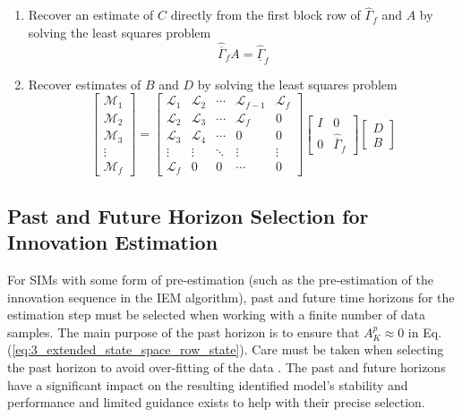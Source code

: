 \begin{table}[!htb]
{\begin{minipage}{5.5in}
\begin{enumerate}
\item Recover an estimate of $C$ directly from the first block row of $\hat{\Gamma}_f$ and $A$ by solving the least squares problem
\begin{equation*}
\hat{\overline{\Gamma}}_f A = \hat{\underline{\Gamma}}_f
\end{equation*}

\item Recover estimates of $B$ and $D$ by solving the least squares problem
\begin{equation*}
\begin{bmatrix}\mathcal{M}_1\\ \mathcal{M}_2\\ \mathcal{M}_3\\ \vdots\\ \mathcal{M}_f\end{bmatrix} = 
\begin{bmatrix}
\mathcal{L}_1 & \mathcal{L}_2 & \cdots & \mathcal{L}_{f-1} & \mathcal{L}_f\\
\mathcal{L}_2 & \mathcal{L}_3 & \cdots & \mathcal{L}_{f} & 0\\
\mathcal{L}_3 & \mathcal{L}_4 & \cdots & 0 & 0\\
\vdots & \vdots & \ddots & \vdots & \vdots\\
\mathcal{L}_f & 0 & 0 & \cdots & 0
\end{bmatrix}
\begin{bmatrix}I & 0\\ 0 & \hat{\overline{\Gamma}}_f\end{bmatrix}
\begin{bmatrix}D \\ B\end{bmatrix}
\end{equation*}
\end{enumerate}
\end{minipage}}
\label{iem_overview}
\end{table}


\subsection{Past and Future Horizon Selection for Innovation Estimation}\label{sec:past_and_future_horizon_selection}
For SIMs with some form of pre-estimation (such as the pre-estimation of the innovation sequence in the IEM algorithm), past and future time horizons for the estimation step must be selected when working with a finite number of data samples. The main purpose of the past horizon is to ensure that $A_K^p \approx 0$ in Eq. (\ref{eq:3_extended_state_space_row_state}). Care must be taken when selecting the past horizon to avoid over-fitting of the data \cite{van2013closed}. The past and future horizons have a significant impact on the resulting identified model's stability and performance and limited guidance exists to help with their precise selection. 

